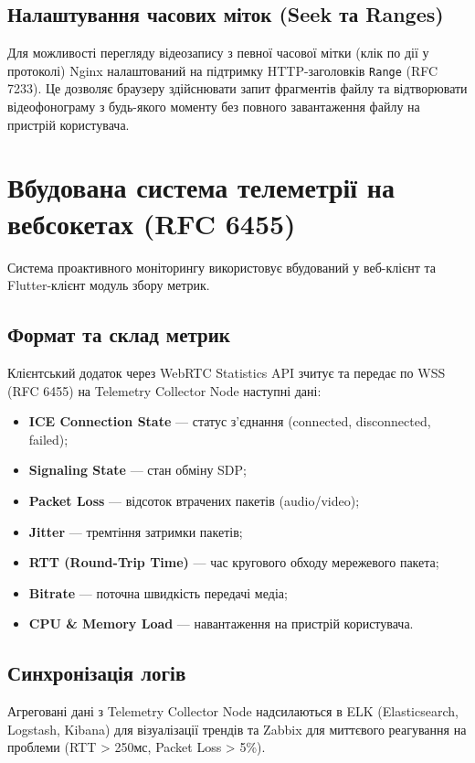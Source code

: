 \documentclass{article}
\begin{document}
\subsection{Налаштування часових міток (Seek та Ranges)}
Для можливості перегляду відеозапису з певної часової мітки (клік по дії у протоколі) Nginx налаштований на підтримку HTTP-заголовків \texttt{Range} (RFC 7233). Це дозволяє браузеру здійснювати запит фрагментів файлу та відтворювати відеофонограму з будь-якого моменту без повного завантаження файлу на пристрій користувача.

\section{Вбудована система телеметрії на вебсокетах (RFC 6455)}
Система проактивного моніторингу використовує вбудований у веб-клієнт та Flutter-клієнт модуль збору метрик.

\subsection{Формат та склад метрик}
Клієнтський додаток через WebRTC Statistics API зчитує та передає по WSS (RFC 6455) на Telemetry Collector Node наступні дані:
\begin{itemize}
    \item \textbf{ICE Connection State} --- статус з'єднання (connected, disconnected, failed);
    \item \textbf{Signaling State} --- стан обміну SDP;
    \item \textbf{Packet Loss} --- відсоток втрачених пакетів (audio/video);
    \item \textbf{Jitter} --- тремтіння затримки пакетів;
    \item \textbf{RTT (Round-Trip Time)} --- час кругового обходу мережевого пакета;
    \item \textbf{Bitrate} --- поточна швидкість передачі медіа;
    \item \textbf{CPU \& Memory Load} --- навантаження на пристрій користувача.
\end{itemize}

\subsection{Синхронізація логів}
Агреговані дані з Telemetry Collector Node надсилаються в ELK (Elasticsearch, Logstash, Kibana) для візуалізації трендів та Zabbix для миттєвого реагування на проблеми (RTT > 250мс, Packet Loss > 5\%).
\end{document}
